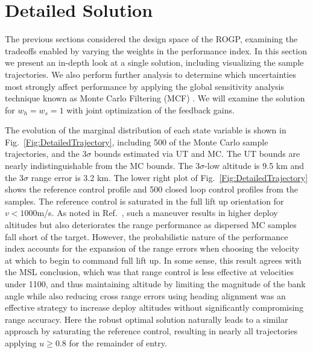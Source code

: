 \section{Detailed Solution}
The previous sections considered the design space of the ROGP, examining the tradeoffs enabled by varying the weights in the performance index. In this section we present an in-depth look at a single solution, including visualizing the sample trajectories. We also perform further analysis to determine which uncertainties most strongly affect performance by applying the global sensitivity analysis technique known as Monte Carlo Filtering (MCF) \cite{MonteCarloFiltering}. We will examine the solution for $w_h=w_s=1$ with joint optimization of the feedback gains. 

The evolution of the marginal distribution of each state variable is shown in Fig.~\ref{Fig:DetailedTrajectory}, including 500 of the Monte Carlo sample trajectories, and the 3$\sigma$ bounds estimated via UT and MC. The UT bounds are nearly indistinguishable from the MC bounds. The $3\sigma$-low altitude is 9.5 km and the $3\sigma$ range error is 3.2 km. The lower right plot of Fig.~\ref{Fig:DetailedTrajectory} shows the reference control profile and 500 closed loop control profiles from the samples.
The reference control is saturated in the full lift up orientation for $v<1000$m/s. As noted in Ref.~\cite{MSL_EDL2}, such a maneuver results in higher deploy altitudes but also deteriorates the range performance as dispersed MC samples fall short of the target. However, the probabilistic nature of the performance index accounts for the expansion of the range errors when choosing the velocity at which to begin to command full lift up. In some sense, this result agrees with the MSL conclusion, which was that range control is less effective at velocities under 1100, and thus maintaining altitude by limiting the magnitude of the bank angle while also reducing cross range errors using heading alignment was an effective strategy to increase deploy altitudes without significantly compromising range accuracy. Here the robust optimal solution naturally leads to a similar approach by saturating the reference control, resulting in nearly all trajectories applying $u \ge 0.8$ for the remainder of entry. 

